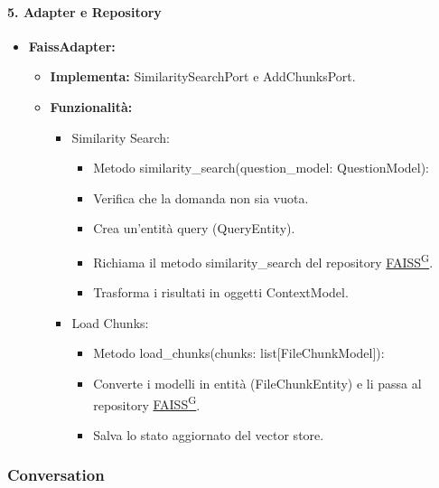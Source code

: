     \paragraph{5. Adapter e Repository}
    \begin{itemize}
        \item \textbf{FaissAdapter:}
        \begin{itemize}
            \item \textbf{Implementa:} SimilaritySearchPort e AddChunksPort.
            \item \textbf{Funzionalità:}
            \begin{itemize}
                \item Similarity Search:
                \begin{itemize}
                    \item Metodo similarity\_search(question\_model: QuestionModel):
                    \item Verifica che la domanda non sia vuota.
                    \item Crea un’entità query (QueryEntity).
                    \item Richiama il metodo similarity\_search del repository \href{https://code7crusaders.github.io/docs/PB/documentazione_interna/glossario.html#faiss}{FAISS\textsuperscript{G}}.
                    \item Trasforma i risultati in oggetti ContextModel.
                \end{itemize}
                \item Load Chunks:
                \begin{itemize}
                    \item Metodo load\_chunks(chunks: list[FileChunkModel]):
                    \item Converte i modelli in entità (FileChunkEntity) e li passa al repository \href{https://code7crusaders.github.io/docs/PB/documentazione_interna/glossario.html#faiss}{FAISS\textsuperscript{G}}.
                    \item Salva lo stato aggiornato del vector store.
                \end{itemize}
            \end{itemize}
        \end{itemize}
    \end{itemize}

    \subsubsection{Conversation}

